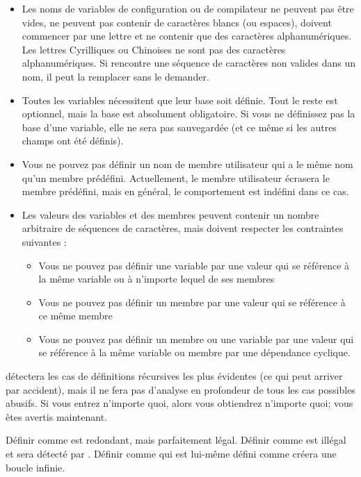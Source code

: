 \begin{itemize}
\item Les noms de variables de configuration ou de compilateur ne peuvent pas être vides, ne peuvent pas contenir de caractères blancs (ou espaces), doivent commencer par une lettre et ne contenir que des caractères alphanumériques. Les lettres Cyrilliques ou Chinoises ne sont pas des caractères alphanumériques. Si \codeblocks rencontre une séquence de caractères non valides dans un nom, il peut la remplacer sans le demander.
\item Toutes les variables nécessitent que leur base soit définie. Tout le reste est optionnel, mais la base est absolument obligatoire. Si vous ne définissez pas la base d'une variable, elle ne sera pas sauvegardée (et ce même si les autres champs ont été définis).
\item Vous ne pouvez pas définir un nom de membre utilisateur qui a le même nom qu'un membre prédéfini. Actuellement, le membre utilisateur écrasera le membre prédéfini, mais en général, le comportement est indéfini dans ce cas.
\item Les valeurs des variables et des membres peuvent contenir un nombre arbitraire de séquences de caractères, mais doivent respecter les contraintes suivantes :
\begin{itemize}
\item Vous ne pouvez pas définir une variable par une valeur qui se référence à la même variable ou à n'importe lequel de ses membres
\item Vous ne pouvez pas définir un membre par une valeur qui se référence à ce même membre
\item Vous ne pouvez pas définir un membre ou une variable par une valeur qui se référence à la même variable ou membre par une dépendance cyclique.
\end{itemize}
\end{itemize}

\codeblocks détectera les cas de définitions récursives les plus évidentes (ce qui peut arriver par accident), mais il ne fera pas d'analyse en profondeur de tous les cas possibles abusifs. Si vous entrez n'importe quoi, alors vous obtiendrez n'importe quoi; vous êtes avertis maintenant.


Définir  comme  est redondant, mais parfaitement légal.
Définir  comme  est illégal et sera détecté par \codeblocks .
Définir  comme  qui est lui-même défini comme  créera une boucle infinie.

